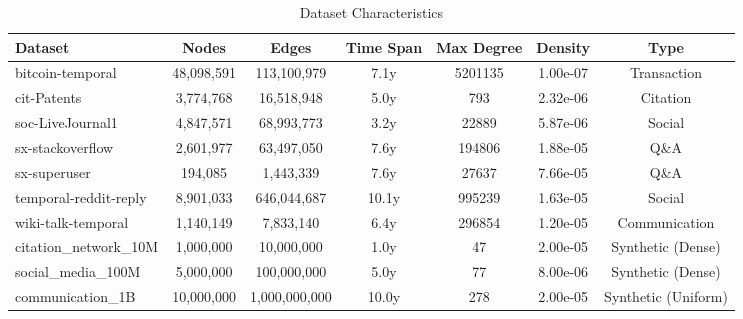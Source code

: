 \begin{table}[htbp]
\centering
\caption{Dataset Characteristics}
\label{tab:datasets}
\begin{tabular}{l|c|c|c|c|c|c}
\hline
\textbf{Dataset} & \textbf{Nodes} & \textbf{Edges} & \textbf{Time Span} & \textbf{Max Degree} & \textbf{Density} & \textbf{Type} \\
\hline
bitcoin-temporal & 48,098,591 & 113,100,979 & 7.1y & 5201135 & 1.00e-07 & Transaction \\
cit-Patents & 3,774,768 & 16,518,948 & 5.0y & 793 & 2.32e-06 & Citation \\
soc-LiveJournal1 & 4,847,571 & 68,993,773 & 3.2y & 22889 & 5.87e-06 & Social \\
sx-stackoverflow & 2,601,977 & 63,497,050 & 7.6y & 194806 & 1.88e-05 & Q\&A \\
sx-superuser & 194,085 & 1,443,339 & 7.6y & 27637 & 7.66e-05 & Q\&A \\
temporal-reddit-reply & 8,901,033 & 646,044,687 & 10.1y & 995239 & 1.63e-05 & Social \\
wiki-talk-temporal & 1,140,149 & 7,833,140 & 6.4y & 296854 & 1.20e-05 & Communication \\
citation\_network\_10M & 1,000,000 & 10,000,000 & 1.0y & 47 & 2.00e-05 & Synthetic (Dense) \\
social\_media\_100M & 5,000,000 & 100,000,000 & 5.0y & 77 & 8.00e-06 & Synthetic (Dense) \\
communication\_1B & 10,000,000 & 1,000,000,000 & 10.0y & 278 & 2.00e-05 & Synthetic (Uniform) \\
\hline
\end{tabular}
\end{table}
